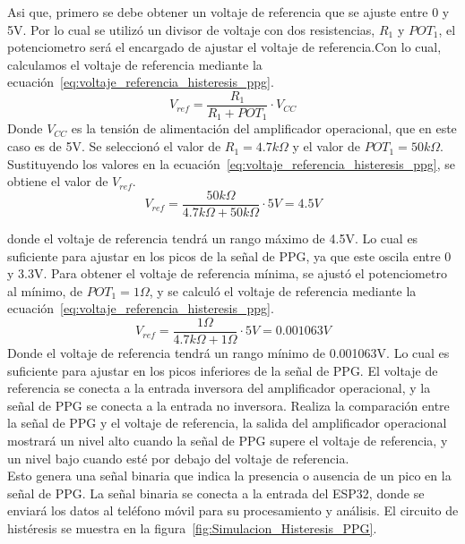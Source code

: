        Asi que, primero se debe obtener un voltaje de referencia que se ajuste entre 0 y 5V. Por lo cual se utilizó un divisor de voltaje con dos resistencias, $R_1$ y $POT_1$, el potenciometro será el encargado de ajustar el voltaje de referencia.Con lo cual, calculamos el voltaje de referencia mediante la ecuación~\ref{eq:voltaje_referencia_histeresis_ppg}.
        \begin{equation}
            \label{eq:voltaje_referencia_histeresis_ppg}
            V_{ref} = \frac{R_1}{R_1 + POT_1} \cdot V_{CC}
        \end{equation}
        Donde $V_{CC}$ es la tensión de alimentación del amplificador operacional, que en este caso es de 5V. Se seleccionó el valor de $R_1 = 4.7 k\Omega$ y el valor de $POT_1 = 50 k\Omega$. 
        Sustituyendo los valores en la ecuación~\ref{eq:voltaje_referencia_histeresis_ppg}, se obtiene el valor de $V_{ref}$.
        \begin{equation}
            V_{ref} = \frac{50k\Omega}{4.7k\Omega + 50k\Omega} \cdot 5V = 4.5 V
        \end{equation}
        
        donde el voltaje de referencia tendrá un rango máximo de 4.5V. Lo cual es suficiente para ajustar en los picos de la señal de PPG, ya que este oscila entre 0 y 3.3V.
        Para obtener el voltaje de referencia mínima, se ajustó el potenciometro al mínimo, de $POT_1 = 1\Omega$, y se calculó el voltaje de referencia mediante la ecuación~\ref{eq:voltaje_referencia_histeresis_ppg}.
        \begin{equation}
            V_{ref} = \frac{1\Omega}{4.7k\Omega + 1\Omega} \cdot 5V = 0.001063 V
        \end{equation}
        Donde el voltaje de referencia tendrá un rango mínimo de 0.001063V. Lo cual es suficiente para ajustar en los picos inferiores de la señal de PPG.
        El voltaje de referencia se conecta a la entrada inversora del amplificador operacional, y la señal de PPG se conecta a la entrada no inversora. Realiza la comparación entre la señal de PPG y el voltaje de referencia, la salida del amplificador operacional mostrará un nivel alto cuando la señal de PPG supere el voltaje de referencia, y un nivel bajo cuando esté por debajo del voltaje de referencia. \\
        
        Esto genera una señal binaria que indica la presencia o ausencia de un pico en la señal de PPG.
        La señal binaria se conecta a la entrada del ESP32, donde se enviará los datos al teléfono móvil para su procesamiento y análisis.
        El circuito de histéresis se muestra en la figura~\ref{fig:Simulacion_Histeresis_PPG}.

